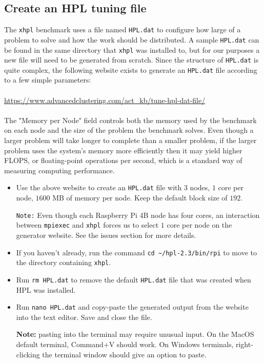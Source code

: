 \documentclass{article}
\newcommand{\tttilde}[0]{\textasciitilde{}}
\begin{document}
\subsection{Create an HPL tuning file}

The \texttt{xhpl} benchmark uses a file named \texttt{HPL.dat} to configure how large of a problem to solve and how the work should be distributed. A sample \texttt{HPL.dat} can be found in the same directory that \texttt{xhpl} was installed to, but for our purposes a new file will need to be generated from scratch. Since the structure of \texttt{HPL.dat} is quite complex, the following website exists to generate an \texttt{HPL.dat} file according to a few simple parameters:
\\~\\
\url{https://www.advancedclustering.com/act\_kb/tune-hpl-dat-file/}
\\~\\

The "Memory per Node" field controls both the memory used by the benchmark on each node and the size of the problem the benchmark solves. Even though a larger problem will take longer to complete than a smaller problem, if the larger problem uses the system's memory more efficiently then it may yield higher FLOPS, or floating-point operations per second, which is a standard way of measuring computing performance.

\begin{itemize}
    \item Use the above website to create an \texttt{HPL.dat} file with $3$ nodes, $1$ core per node, $1600$ MB of memory per node. Keep the default block size of $192$.
    
    \texttt{Note:} Even though each Raspberry Pi 4B node has four cores, an interaction between \texttt{mpiexec} and \texttt{xhpl} forces us to select $1$ core per node on the generator website. See the issues section for more details.
    
    \item If you haven't already, run the command \texttt{cd \tttilde/hpl-2.3/bin/rpi} to move to the directory containing \texttt{xhpl}.
    
    \item Run \texttt{rm HPL.dat} to remove the default \texttt{HPL.dat} file that was created when HPL was installed.
    
    \item Run \texttt{nano HPL.dat} and copy-paste the generated output from the website into the text editor. Save and close the file.
    
    \textbf{Note:} pasting into the terminal may require unusual input. On the MacOS default terminal, Command+V should work. On Windows terminals, right-clicking the terminal window should give an option to paste.
\end{itemize}
\end{document}

